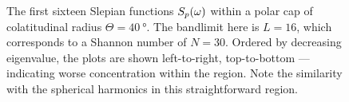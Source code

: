 \begin{figure}[htpb]
	\newline
	\hfill
	\hfill
	\hfill
	\caption[
		The Slepian functions within a \(\SI{40}{\degree}\) polar cap
	]{
		The first sixteen Slepian functions \({S}_{p}(\omega)\) within a polar cap of colatitudinal radius \(\Theta=\SI{40}{\degree}\).
		The bandlimit here is  \(L=16\), which corresponds to a Shannon number of \(N=30\).
		Ordered by decreasing eigenvalue, the plots are shown left-to-right, top-to-bottom --- indicating worse concentration within the region.
		Note the similarity with the spherical harmonics in this straightforward region.
	}\label{fig:chapter2_slepian_polar_cap}
\end{figure}
